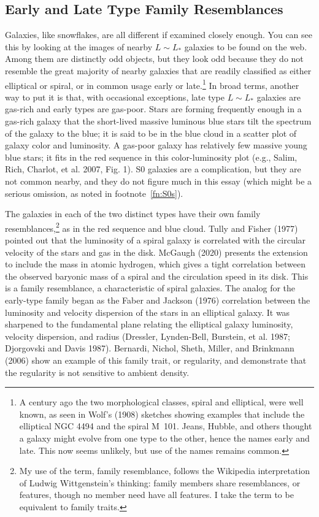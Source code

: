 \documentclass[fleqn,12pt]{article}
\begin{document}
\subsection{Early and Late Type Family Resemblances} \label{sec:earlyandlate}

Galaxies, like snowflakes, are all different if examined closely enough. You can see this by looking at the images of nearby $L\sim L_\ast$ galaxies to be found on the web. Among them are distinctly odd objects, but they look odd because they do not resemble the great majority of nearby galaxies that are readily classified as either elliptical or spiral, or in common usage early or late.\footnote{A century ago the two morphological classes, spiral and elliptical, were well known, as seen in Wolf's (1908) sketches showing examples that include the elliptical NGC 4494 and the spiral M~101. Jeans, Hubble, and others thought a galaxy might evolve from one type to the other, hence the names early and late. This now seems unlikely, but use of the names remains common.} In broad terms, another way to put it is that, with occasional exceptions, late type $L\sim L_\ast$ galaxies are gas-rich and early types are gas-poor. Stars are forming frequently enough in a gas-rich galaxy that the short-lived massive luminous blue stars tilt the spectrum of the galaxy to the blue; it is said to be in the blue cloud in a scatter plot of galaxy color and luminosity. A gas-poor galaxy has relatively few massive young blue stars; it fits in the red sequence in this color-luminosity plot (e.g., Salim, Rich, Charlot, et al. 2007, Fig. 1). S0 galaxies are a complication, but they are not common nearby, and they do not figure much in this essay (which might be a serious omission, as noted in footnote~\ref{fn:S0s}).

The galaxies in each of the two distinct types have their own family resemblances,\footnote{My use of the term, family resemblance, follows the Wikipedia interpretation of Ludwig Wittgenstein's thinking: family members share resemblances, or features, though no member need have all features. I take the term to be equivalent to family traits.} as in the red sequence and blue cloud. Tully and Fisher (1977) pointed out that the luminosity of a spiral galaxy is correlated with the circular velocity of the stars and gas in the disk. McGaugh (2020) presents the extension to include the mass in atomic hydrogen, which gives a tight correlation between the observed baryonic mass of a spiral and the circulation speed in its disk. This is a family resemblance, a characteristic of spiral galaxies. The analog for the early-type family began as the Faber and Jackson (1976) correlation between the luminosity and velocity dispersion of the stars in an elliptical galaxy. It was sharpened to the fundamental plane relating the elliptical galaxy luminosity, velocity dispersion, and radius (Dressler, Lynden-Bell, Burstein, et al. 1987; Djorgovski and Davis 1987). Bernardi, Nichol, Sheth, Miller, and Brinkmann (2006) show an example of this family trait, or regularity, and demonstrate that the regularity  is not sensitive to ambient density.
\end{document}
